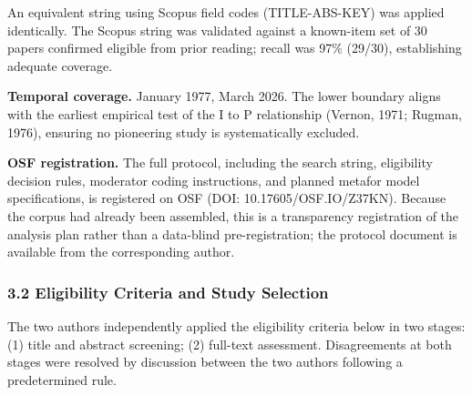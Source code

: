 \documentclass[
  12pt,a4paper]{article}
\begin{document}
An equivalent string using Scopus field codes (TITLE-ABS-KEY) was
applied identically. The Scopus string was validated against a
known-item set of 30 papers confirmed eligible from prior reading;
recall was 97\% (29/30), establishing adequate coverage.

\textbf{Temporal coverage.} January 1977, March 2026. The lower boundary
aligns with the earliest empirical test of the I to P relationship
(Vernon, 1971; Rugman, 1976), ensuring no pioneering study is
systematically excluded.

\textbf{OSF registration.} The full protocol, including the search
string, eligibility decision rules, moderator coding instructions, and
planned metafor model specifications, is registered on OSF (DOI:
10.17605/OSF.IO/Z37KN). Because the corpus had already been assembled,
this is a transparency registration of the analysis plan rather than a
data-blind pre-registration; the protocol document is available from the
corresponding author.

\hypertarget{eligibility-criteria-and-study-selection}{%
\subsubsection{3.2 Eligibility Criteria and Study
Selection}\label{eligibility-criteria-and-study-selection}}

The two authors independently applied the eligibility criteria below in
two stages: (1) title and abstract screening; (2) full-text assessment.
Disagreements at both stages were resolved by discussion between the two
authors following a predetermined rule.
\end{document}
